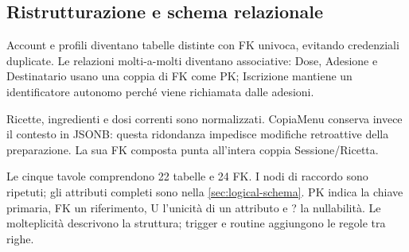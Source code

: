 \documentclass[11pt,a4paper]{article}
\begin{document}
\clearpage\begin{landscape}
\section{Ristrutturazione e schema relazionale}
Account e profili diventano tabelle distinte con FK univoca, evitando credenziali duplicate. Le relazioni molti-a-molti diventano associative: Dose, Adesione e Destinatario usano una coppia di FK come PK; Iscrizione mantiene un identificatore autonomo perché viene richiamata dalle adesioni.

Ricette, ingredienti e dosi correnti sono normalizzati. CopiaMenu conserva invece il contesto in JSONB: questa ridondanza impedisce modifiche retroattive della preparazione. La sua FK composta punta all'intera coppia Sessione/Ricetta.

Le cinque tavole comprendono 22 tabelle e 24 FK. I nodi di raccordo sono ripetuti; gli attributi completi sono nella \cref{sec:logical-schema}. PK indica la chiave primaria, FK un riferimento, U l'unicità di un attributo e ? la nullabilità. Le molteplicità descrivono la struttura; trigger e routine aggiungono le regole tra righe.



\end{landscape}
\end{document}

